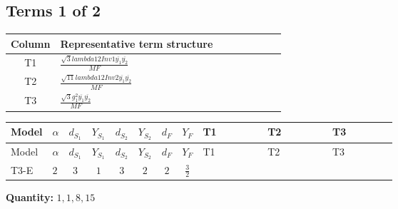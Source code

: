 \documentclass[8pt]{article}
\begin{document}
\begin{landscape}
\subsection*{Terms 1 of 2}
\begin{center}
\begin{tabular}{@{}c >{\raggedright\arraybackslash}p{0.82\linewidth}@{}}
\toprule
Column & Representative term structure \\
\midrule
T1 & \(\displaystyle \frac{\sqrt{3} lambda12Inv1 \overline{y_{1}} \overline{y_{2}}}{MF}\) \\
\midrule
T2 & \(\displaystyle \frac{\sqrt{11} lambda12Inv2 \overline{y_{1}} \overline{y_{2}}}{MF}\) \\
\midrule
T3 & \(\displaystyle \frac{\sqrt{3} g_{1}^{2} \overline{y_{1}} \overline{y_{2}}}{MF}\) \\
\midrule
\bottomrule
\end{tabular}
\end{center}
\smallskip
\tiny
\begin{longtable}{@{}llcccccc >{\raggedright\arraybackslash}p{0.21\linewidth} >{\raggedright\arraybackslash}p{0.21\linewidth} >{\raggedright\arraybackslash}p{0.21\linewidth}@{}}
\toprule
Model & $\alpha$ & $d_{S_1}$ & $Y_{S_1}$ & $d_{S_2}$ & $Y_{S_2}$ & $d_F$ & $Y_F$ & T1 & T2 & T3 \\
\midrule
\endfirsthead
\toprule
Model & $\alpha$ & $d_{S_1}$ & $Y_{S_1}$ & $d_{S_2}$ & $Y_{S_2}$ & $d_F$ & $Y_F$ & T1 & T2 & T3 \\
\midrule
\endhead
T3-E & $2$ & $3$ & $1$ & $3$ & $2$ & $2$ & $\frac{3}{2}$ & \scriptsize\adjustbox{max width=\linewidth}{$\begin{gathered} - \frac{\sqrt{3} lambda12Inv1 \overline{y_{1}} \overline{y_{2}}}{6 MF}\end{gathered}$} & \scriptsize\adjustbox{max width=\linewidth}{$\begin{gathered} \frac{3 \sqrt{11} lambda12Inv2 \overline{y_{1}} \overline{y_{2}}}{22 MF}\end{gathered}$} & \scriptsize\adjustbox{max width=\linewidth}{$\begin{gathered} \frac{9 \sqrt{3} g_{1}^{2} \overline{y_{1}} \overline{y_{2}}}{8 MF}\end{gathered}$} \\
\midrule
\bottomrule
\end{longtable}
\clearpage
\noindent\textbf{Quantity: }$\mathrm{1,1,8,15}$\par\smallskip

\end{landscape}
\end{document}

